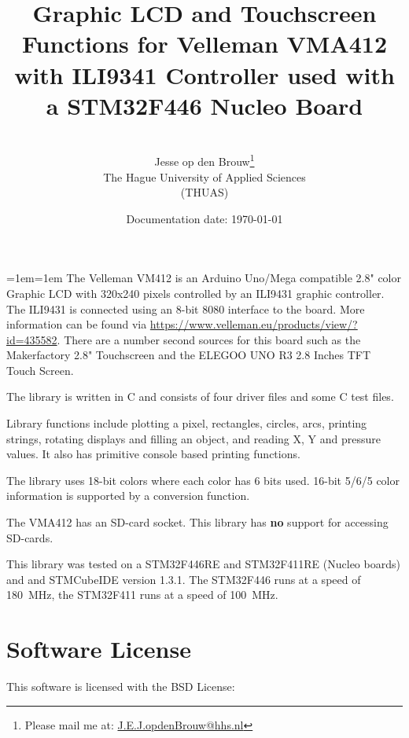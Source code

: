 \documentclass[12pt]{article}
\author{\version\\[2ex]Jesse op den Brouw\thanks{Please mail me at: \href{mailto:J.E.J.opdenBrouw@hhs.nl}{J.E.J.opdenBrouw@hhs.nl}}\\The Hague University of Applied Sciences\\(THUAS)}
\title{Graphic LCD and Touchscreen Functions for Velleman VMA412 with ILI9341 Controller used with a STM32F446 Nucleo Board}
\date{Documentation date: \today}
\begin{document}
\raggedbottom
\maketitle

\vfill
{\small\leftskip=1em\rightskip=1em
The Velleman VM412 is an Arduino Uno/Mega compatible 2.8" color Graphic LCD with 320x240 pixels controlled by an ILI9431 graphic controller. The ILI9431 is connected using an 8-bit 8080 interface to the board. More information can be found via \url{https://www.velleman.eu/products/view/?id=435582}. There are a number second sources for this board such as the Makerfactory 2.8" Touchscreen and the ELEGOO UNO R3 2.8 Inches TFT Touch Screen.

The library is written in C and consists of four driver files and some C test files.

Library functions include plotting a pixel, rectangles, circles, arcs, printing strings, rotating displays and filling an object, and reading X, Y and pressure values. It also has primitive console based printing functions.

The library uses 18-bit colors where each color has 6 bits used. 16-bit 5/6/5 color information is supported by a conversion function.

The VMA412 has an SD-card socket. This library has \textbf{no} support for accessing SD-cards.

This library was tested on a STM32F446RE and STM32F411RE (Nucleo boards) and and STMCubeIDE version 1.3.1. The STM32F446 runs at a speed of 180~MHz, the STM32F411 runs at  a speed of 100~MHz.

}
\vfill

\newpage

\tableofcontents


\newpage

\section{Software License}
This software is licensed with the BSD License:
\end{document}
